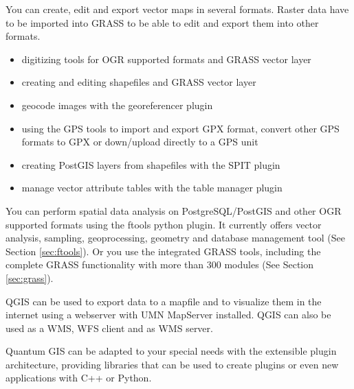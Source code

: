 You can create, edit and export vector maps in several formats. Raster data
have to be imported into GRASS to be able to edit and export them into other
formats.  

\begin{itemize}
\item digitizing tools for OGR supported formats and GRASS vector layer
\item creating and editing shapefiles and GRASS vector layer
\item geocode images with the georeferencer plugin
\item using the GPS tools to import and export GPX format, convert other GPS
formats to GPX or down/upload directly to a GPS unit
\item creating PostGIS layers from shapefiles with the SPIT plugin
\item manage vector attribute tables with the table manager plugin  
\end{itemize}


You can perform spatial data analysis on PostgreSQL/PostGIS and other OGR
supported formats using the ftools python plugin. It currently offers
vector analysis, sampling, geoprocessing, geometry and database management
tool (See Section \ref{sec:ftools}). Or you use the integrated GRASS tools,
including the complete GRASS functionality with more than 300 modules (See
Section \ref{sec:grass}).


QGIS can be used to export data to a mapfile and to visualize them in the
internet using a webserver with UMN MapServer installed. QGIS can also
be used as a WMS, WFS client and as WMS server. 


Quantum GIS can be adapted to your special needs with the extensible
plugin architecture, providing libraries that can be used to create plugins
or even new applications with C++ or Python.     

